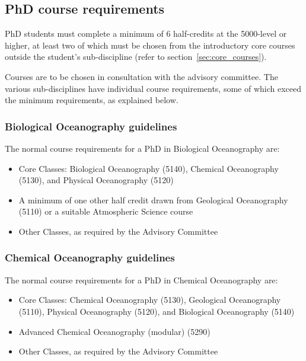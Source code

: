 \documentclass{article}
\begin{document}
\subsection{PhD course requirements}

PhD students must complete a minimum of 6 half-credits at the 5000-level or
higher, at least two of which must be chosen from the introductory core courses
outside the student's sub-discipline (refer to section~\ref{sec:core_courses}).


Courses are to be chosen in consultation with the advisory committee. The
various sub-disciplines have individual course requirements, some of which
exceed the minimum requirements, as explained below.

\subsubsection{Biological Oceanography guidelines}

The normal course requirements for a PhD in Biological Oceanography are:
\begin{itemize}
\item Core Classes: Biological Oceanography (5140), Chemical Oceanography (5130), and Physical Oceanography (5120)
\item A minimum of one other half credit drawn from Geological Oceanography (5110) or a suitable Atmospheric Science course
\item Other Classes, as required by the Advisory Committee
\end{itemize}

\subsubsection{Chemical Oceanography guidelines}

The normal course requirements for a PhD in Chemical Oceanography are:

\begin{itemize}
\item Core Classes: Chemical Oceanography (5130), Geological Oceanography (5110), Physical Oceanography (5120), and Biological Oceanography (5140)
\item Advanced Chemical Oceanography (modular) (5290)
\item Other Classes, as required by the Advisory Committee
\end{itemize}
\end{document}
